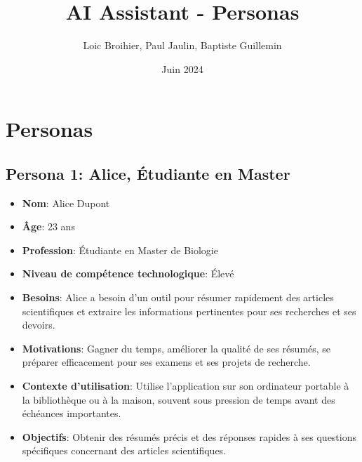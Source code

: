\documentclass{article}
\title{AI Assistant - Personas}
\author{Loic Broihier, Paul Jaulin, Baptiste Guillemin}
\date{Juin 2024}
\begin{document}
\maketitle

\section*{Personas}

\subsection*{Persona 1: Alice, Étudiante en Master}
\begin{itemize}
    \item \textbf{Nom}: Alice Dupont
    \item \textbf{Âge}: 23 ans
    \item \textbf{Profession}: Étudiante en Master de Biologie
    \item \textbf{Niveau de compétence technologique}: Élevé
    \item \textbf{Besoins}: Alice a besoin d'un outil pour résumer rapidement des articles scientifiques et extraire les informations pertinentes pour ses recherches et ses devoirs.
    \item \textbf{Motivations}: Gagner du temps, améliorer la qualité de ses résumés, se préparer efficacement pour ses examens et ses projets de recherche.
    \item \textbf{Contexte d'utilisation}: Utilise l'application sur son ordinateur portable à la bibliothèque ou à la maison, souvent sous pression de temps avant des échéances importantes.
    \item \textbf{Objectifs}: Obtenir des résumés précis et des réponses rapides à ses questions spécifiques concernant des articles scientifiques.
\end{itemize}
\end{document}
